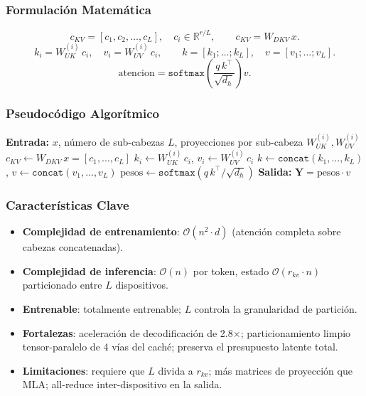 \subsubsection{Formulación Matemática}
\[
c_{KV} = [c_1, c_2, \ldots, c_L], \quad c_i \in \mathbb{R}^{r/L}, \qquad c_{KV} = W_{DKV}\, x.
\]
\[
k_i = W_{UK}^{(i)}\, c_i, \quad v_i = W_{UV}^{(i)}\, c_i, \qquad
k = [k_1; \ldots; k_L], \quad v = [v_1; \ldots; v_L].
\]
\[
\text{atencion} = \texttt{softmax}\!\left(\frac{q\, k^\top}{\sqrt{d_h}}\right) v.
\]

\subsubsection{Pseudocódigo Algorítmico}
\begin{algorithmic}[1]
\State \textbf{Entrada:} $x$, número de sub-cabezas $L$, proyecciones por sub-cabeza $W_{UK}^{(i)}, W_{UV}^{(i)}$
\State $c_{KV} \gets W_{DKV}\, x = [c_1, \ldots, c_L]$ 
    \State $k_i \gets W_{UK}^{(i)}\, c_i$, \quad $v_i \gets W_{UV}^{(i)}\, c_i$
\EndFor
\State $k \gets \texttt{concat}(k_1, \ldots, k_L)$, \quad $v \gets \texttt{concat}(v_1, \ldots, v_L)$
\State $\text{pesos} \gets \texttt{softmax}(q\, k^\top / \sqrt{d_h})$
\State \textbf{Salida:} $\mathbf{Y} = \text{pesos} \cdot v$
\end{algorithmic}

\subsubsection{Características Clave}
\begin{itemize}[leftmargin=*]
    \item \textbf{Complejidad de entrenamiento}: $\mathcal{O}(n^2 \cdot d)$ (atención completa sobre cabezas concatenadas).
    \item \textbf{Complejidad de inferencia}: $\mathcal{O}(n)$ por token, estado $\mathcal{O}(r_{kv} \cdot n)$ particionado entre $L$ dispositivos.
    \item \textbf{Entrenable}: totalmente entrenable; $L$ controla la granularidad de partición.
    \item \textbf{Fortalezas}: aceleración de decodificación de 2.8$\times$; particionamiento limpio tensor-paralelo de 4 vías del caché; preserva el presupuesto latente total.
    \item \textbf{Limitaciones}: requiere que $L$ divida a $r_{kv}$; más matrices de proyección que MLA; all-reduce inter-dispositivo en la salida.
\end{itemize}

